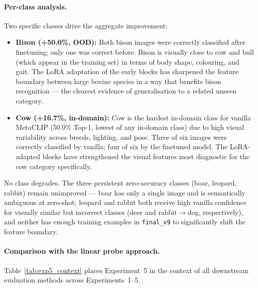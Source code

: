\paragraph{Per-class analysis.}
Two specific classes drive the aggregate improvement:
\begin{itemize}
    \item \textbf{Bison (+50.0\%, OOD):} Both bison images were correctly classified after finetuning; only one was correct before. Bison is visually close to cow and bull (which appear in the training set) in terms of body shape, colouring, and gait. The LoRA adaptation of the early blocks has sharpened the feature boundary between large bovine species in a way that benefits bison recognition --- the clearest evidence of generalisation to a related unseen category.
    \item \textbf{Cow (+16.7\%, in-domain):} Cow is the hardest in-domain class for vanilla MetaCLIP (50.0\% Top-1, lowest of any in-domain class) due to high visual variability across breeds, lighting, and pose. Three of six images were correctly classified by vanilla; four of six by the finetuned model. The LoRA-adapted blocks have strengthened the visual features most diagnostic for the cow category specifically.
\end{itemize}
No class degrades. The three persistent zero-accuracy classes (boar, leopard, rabbit) remain unimproved --- boar has only a single image and is semantically ambiguous at zero-shot; leopard and rabbit both receive high vanilla confidence for visually similar but incorrect classes (deer and rabbit$\rightarrow$dog, respectively), and neither has enough training examples in \texttt{final\_v9} to significantly shift the feature boundary.

\paragraph{Comparison with the linear probe approach.}
Table~\ref{tab:exp5_context} places Experiment~5 in the context of all downstream evaluation methods across Experiments~1--5.

